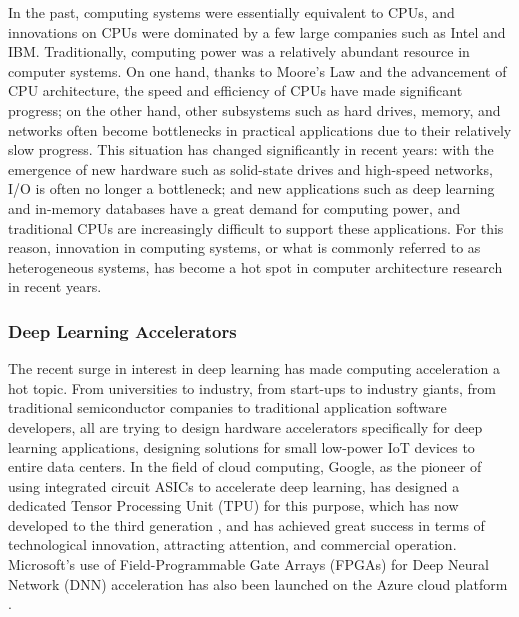 In the past, computing systems were essentially equivalent to CPUs, and innovations on CPUs were dominated by a few large companies such as Intel and IBM. Traditionally, computing power was a relatively abundant resource in computer systems. On one hand, thanks to Moore's Law and the advancement of CPU architecture, the speed and efficiency of CPUs have made significant progress; on the other hand, other subsystems such as hard drives, memory, and networks often become bottlenecks in practical applications due to their relatively slow progress. This situation has changed significantly in recent years: with the emergence of new hardware such as solid-state drives and high-speed networks, I/O is often no longer a bottleneck; and new applications such as deep learning and in-memory databases have a great demand for computing power, and traditional CPUs are increasingly difficult to support these applications. For this reason, innovation in computing systems, or what is commonly referred to as heterogeneous systems, has become a hot spot in computer architecture research in recent years.

\subsubsection{Deep Learning Accelerators}

The recent surge in interest in deep learning has made computing acceleration a hot topic. From universities to industry, from start-ups to industry giants, from traditional semiconductor companies to traditional application software developers, all are trying to design hardware accelerators specifically for deep learning applications, designing solutions for small low-power IoT devices to entire data centers. In the field of cloud computing, Google, as the pioneer of using integrated circuit ASICs to accelerate deep learning, has designed a dedicated Tensor Processing Unit (TPU) for this purpose, which has now developed to the third generation \cite{tpu}, and has achieved great success in terms of technological innovation, attracting attention, and commercial operation. Microsoft's use of Field-Programmable Gate Arrays (FPGAs) for Deep Neural Network (DNN) acceleration has also been launched on the Azure cloud platform \cite{serving-dnns-real-time-datacenter-scale-project-brainwave,a-configurable-cloud-scale-dnn-processor-for-real-time-ai}.

